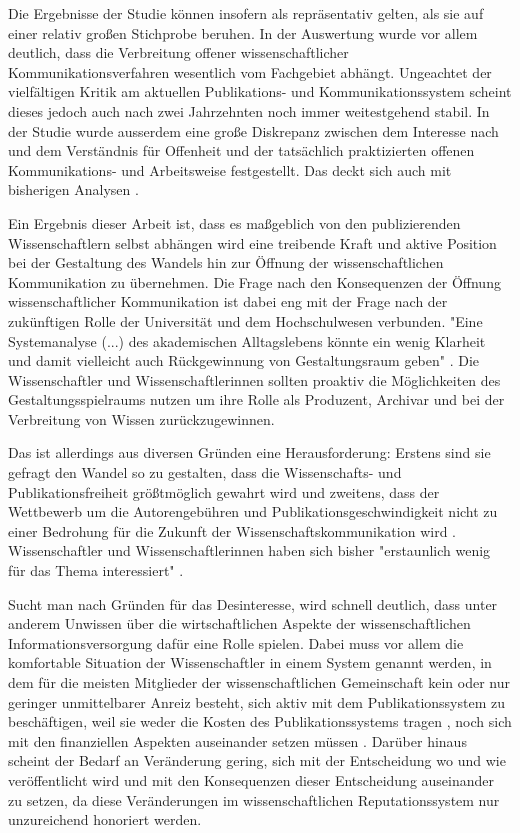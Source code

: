 Die Ergebnisse der Studie können insofern als repräsentativ gelten, als sie auf einer relativ großen Stichprobe beruhen. In der Auswertung wurde vor allem deutlich, dass die Verbreitung offener wissenschaftlicher Kommunikationsverfahren wesentlich vom Fachgebiet abhängt. Ungeachtet der vielfältigen Kritik am aktuellen Publikations- und Kommunikationssystem scheint dieses jedoch auch nach zwei Jahrzehnten noch immer weitestgehend stabil. In der Studie wurde ausserdem eine große Diskrepanz zwischen dem Interesse nach und dem Verständnis für Offenheit und der tatsächlich praktizierten offenen Kommunikations- und Arbeitsweise festgestellt. Das deckt sich auch mit bisherigen Analysen \cite{yiotis_2013_open} \cite{Bartling_2013} \cite{hagner_2015_sache_buches} \cite{Fecher_2015}.

Ein Ergebnis dieser Arbeit ist, dass es maßgeblich von den publizierenden Wissenschaftlern selbst abhängen wird eine treibende Kraft und aktive Position bei der Gestaltung des Wandels hin zur Öffnung der wissenschaftlichen Kommunikation zu übernehmen. Die Frage nach den Konsequenzen der Öffnung wissenschaftlicher Kommunikation ist dabei eng mit der Frage nach der zukünftigen Rolle der Universität und dem Hochschulwesen verbunden. "Eine Systemanalyse (...) des akademischen Alltagslebens  könnte  ein wenig Klarheit und damit vielleicht auch Rückgewinnung von Ge­staltungsraum geben" \cite{Warnke_2012}. Die Wissenschaftler und Wissenschaftlerinnen sollten proaktiv die Möglichkeiten des Gestaltungsspielraums nutzen um ihre Rolle als Produzent, Archivar und bei der Verbreitung von Wissen zurückzugewinnen.

Das ist allerdings aus diversen Gründen eine Herausforderung: Erstens sind sie gefragt den Wandel so zu gestalten, dass die Wissenschafts- und Publikationsfreiheit größtmöglich gewahrt wird und zweitens, dass der Wettbewerb um die Autorengebühren und Publikationsgeschwindigkeit nicht zu einer Bedrohung für die Zukunft der Wissenschaftskommunikation wird \cite{Beall_2012} \cite{Lossau_oa_2007}. Wissenschaftler und Wissenschaftlerinnen haben sich bisher "erstaunlich wenig für das Thema interessiert" \cite{hagner_2015_sache_buches}.

Sucht man nach Gründen für das Desinteresse, wird schnell deutlich, dass unter anderem Unwissen über die wirtschaftlichen Aspekte der wissenschaftlichen Informationsversorgung dafür eine Rolle spielen. Dabei muss vor allem die komfortable Situation der Wissenschaftler in einem System genannt werden, in dem für die meisten Mitglieder der wissenschaftlichen Gemeinschaft kein oder nur geringer unmittelbarer Anreiz besteht, sich aktiv mit dem Publikationssystem zu beschäftigen, weil sie weder die Kosten des Publikationssystems tragen \cite{Sietmann_oa_2007}, noch sich mit den finanziellen Aspekten auseinander setzen müssen \cite{herb_2010}. Darüber hinaus scheint der Bedarf an Veränderung gering, sich mit der Entscheidung wo und wie veröffentlicht wird und mit den Konsequenzen dieser Entscheidung auseinander zu setzen, da diese Veränderungen im wissenschaftlichen Reputationssystem nur unzureichend honoriert werden.

